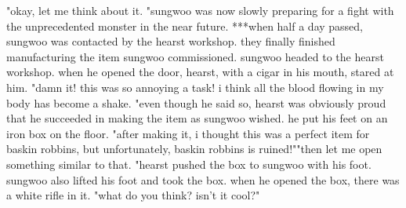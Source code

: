 "okay, let me think about it.
"sungwoo was now slowly preparing for a fight with the unprecedented monster in the near future.
***when half a day passed, sungwoo was contacted by the hearst workshop.
 they finally finished manufacturing the item sungwoo commissioned.
 sungwoo headed to the hearst workshop.
 when he opened the door, hearst, with a cigar in his mouth, stared at him.
"damn it! this was so annoying a task! i think all the blood flowing in my body has become a shake.
"even though he said so, hearst was obviously proud that he succeeded in making the item as sungwoo wished.
 he put his feet on an iron box on the floor.
 "after making it, i thought this was a perfect item for baskin robbins, but unfortunately, baskin robbins is ruined!""then let me open something similar to that.
"hearst pushed the box to sungwoo with his foot.
 sungwoo also lifted his foot and took the box.
 when he opened the box, there was a white rifle in it.
"what do you think? isn't it cool?"

 